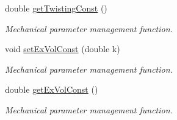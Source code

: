 \begin{DoxyCompactItemize}
double \hyperlink{classMCylinder_aa15887dd8d78c56f00236b2776b79f8b}{get\+Twisting\+Const} ()
\begin{DoxyCompactList}\small\item\em Mechanical parameter management function. \end{DoxyCompactList}\item 
void \hyperlink{classMCylinder_aad7533f1b024044574d17c9e681772a9}{set\+Ex\+Vol\+Const} (double k)
\begin{DoxyCompactList}\small\item\em Mechanical parameter management function. \end{DoxyCompactList}\item 
double \hyperlink{classMCylinder_aafd38200ff997912fae0c1ec8c2140dd}{get\+Ex\+Vol\+Const} ()
\begin{DoxyCompactList}\small\item\em Mechanical parameter management function. \end{DoxyCompactList}\end{DoxyCompactItemize}

